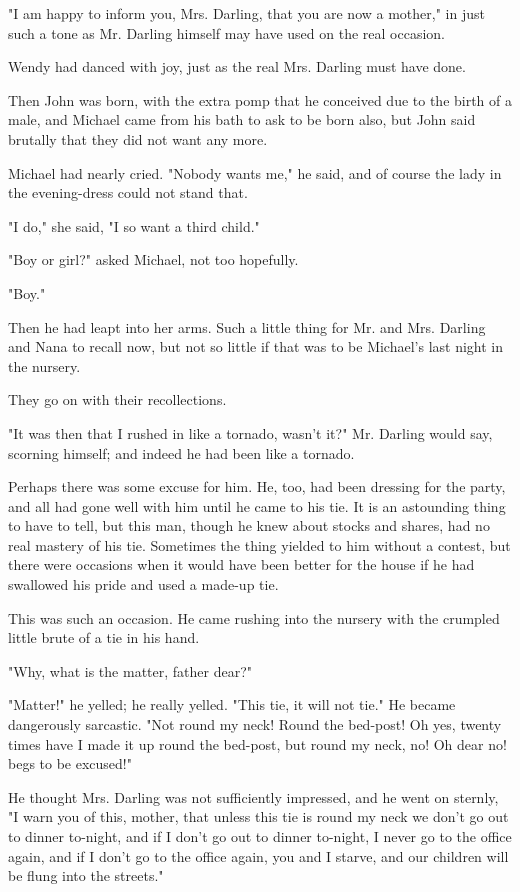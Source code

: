 "I am happy to inform you, Mrs. Darling, that you are now a mother," in
just such a tone as Mr. Darling himself may have used on the real
occasion.


Wendy had danced with joy, just as the real Mrs. Darling must have done.


Then John was born, with the extra pomp that he conceived due to the birth
of a male, and Michael came from his bath to ask to be born also, but John
said brutally that they did not want any more.


Michael had nearly cried. "Nobody wants me," he said, and of course the
lady in the evening-dress could not stand that.


"I do," she said, "I so want a third child."


"Boy or girl?" asked Michael, not too hopefully.


"Boy."


Then he had leapt into her arms. Such a little thing for Mr. and Mrs.
Darling and Nana to recall now, but not so little if that was to be
Michael's last night in the nursery.


They go on with their recollections.


"It was then that I rushed in like a tornado, wasn't it?" Mr. Darling
would say, scorning himself; and indeed he had been like a tornado.


Perhaps there was some excuse for him. He, too, had been dressing for the
party, and all had gone well with him until he came to his tie. It is an
astounding thing to have to tell, but this man, though he knew about
stocks and shares, had no real mastery of his tie. Sometimes the thing
yielded to him without a contest, but there were occasions when it would
have been better for the house if he had swallowed his pride and used a
made-up tie.


This was such an occasion. He came rushing into the nursery with the
crumpled little brute of a tie in his hand.


"Why, what is the matter, father dear?"


"Matter!" he yelled; he really yelled. "This tie, it will not tie." He
became dangerously sarcastic. "Not round my neck! Round the bed-post! Oh
yes, twenty times have I made it up round the bed-post, but round my neck,
no! Oh dear no! begs to be excused!"


He thought Mrs. Darling was not sufficiently impressed, and he went on
sternly, "I warn you of this, mother, that unless this tie is round my
neck we don't go out to dinner to-night, and if I don't go out to dinner
to-night, I never go to the office again, and if I don't go to the office
again, you and I starve, and our children will be flung into the streets."


